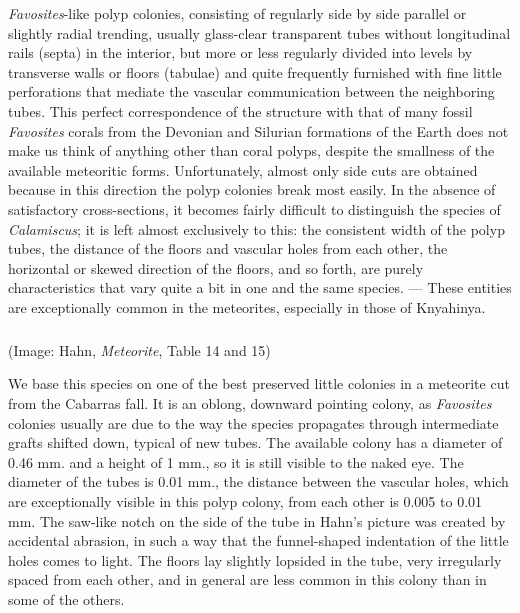 \documentclass[a4paper, 12pt, oneside]{article}
\begin{document}
\emph{Favosites}-like polyp colonies, consisting of regularly side by side parallel or slightly radial trending, usually glass-clear transparent tubes without longitudinal rails (septa) in the interior, but more or less regularly divided into levels by transverse walls or floors (tabulae) and quite frequently furnished with fine little perforations that mediate the vascular communication between the neighboring tubes. This perfect correspondence of the structure with that of many fossil \emph{Favosites} corals from the Devonian and Silurian formations of the Earth does not make us think of anything other than coral polyps, despite the smallness of the available meteoritic forms. Unfortunately, almost only side cuts are obtained because in this direction the polyp colonies break most easily. In the absence of satisfactory cross-sections, it becomes fairly difficult to distinguish the species of \emph{Calamiscus}; it is left almost exclusively to this: the consistent width of the polyp tubes, the distance of the floors and vascular holes from each other, the horizontal or skewed direction of the floors, and so forth, are purely characteristics that vary quite a bit in one and the same species. --- These entities are exceptionally common in the meteorites, especially in those of Knyahinya.
\paragraph{\large{}}
\subparagraph{}
(Image: Hahn, \emph{Meteorite}, Table 14 and 15)

We base this species on one of the best preserved little colonies in a meteorite cut from the Cabarras fall. It is an oblong, downward pointing colony, as \emph{Favosites} colonies usually are due to the way the species propagates through intermediate grafts shifted down, typical of new tubes. The available colony has a diameter of 0.46 mm. and a height of 1 mm., so it is still visible to the naked eye. The diameter of the tubes is 0.01 mm., the distance between the vascular holes, which are exceptionally visible in this polyp colony, from each other is 0.005 to 0.01 mm. The saw-like notch on the side of the tube in Hahn's picture was created by accidental abrasion, in such a way that the funnel-shaped indentation of the little holes comes to light. The floors lay slightly lopsided in the tube, very irregularly spaced from each other, and in general are less common in this colony than in some of the others.
\end{document}
